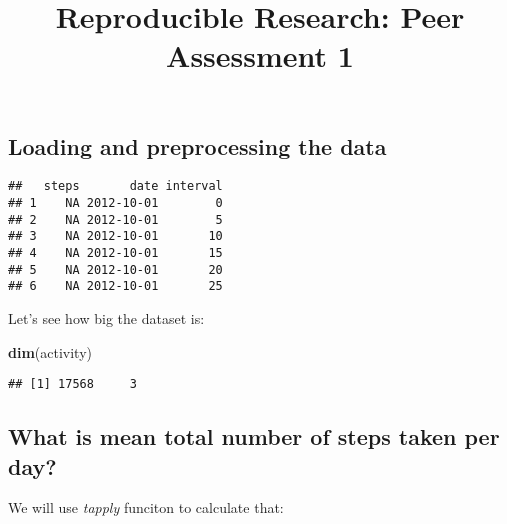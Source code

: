 \documentclass[
]{article}
\title{Reproducible Research: Peer Assessment 1}
\author{}
\date{\vspace{-2.5em}}
\newenvironment{Shaded}{\begin{snugshade}}{\end{snugshade}}
\newcommand{\AttributeTok}[1]{\textcolor[rgb]{0.13,0.29,0.53}{#1}}
\newcommand{\ConstantTok}[1]{\textcolor[rgb]{0.56,0.35,0.01}{#1}}
\newcommand{\FunctionTok}[1]{\textcolor[rgb]{0.13,0.29,0.53}{\textbf{#1}}}
\newcommand{\NormalTok}[1]{#1}
\newcommand{\OtherTok}[1]{\textcolor[rgb]{0.56,0.35,0.01}{#1}}
\newcommand{\SpecialCharTok}[1]{\textcolor[rgb]{0.81,0.36,0.00}{\textbf{#1}}}
\newcommand{\StringTok}[1]{\textcolor[rgb]{0.31,0.60,0.02}{#1}}
\begin{document}
\maketitle

\subsection{Loading and preprocessing the
data}\label{loading-and-preprocessing-the-data}

\begin{Shaded}
\end{Shaded}

\begin{verbatim}
##   steps       date interval
## 1    NA 2012-10-01        0
## 2    NA 2012-10-01        5
## 3    NA 2012-10-01       10
## 4    NA 2012-10-01       15
## 5    NA 2012-10-01       20
## 6    NA 2012-10-01       25
\end{verbatim}

Let's see how big the dataset is:

\begin{Shaded}
\begin{Highlighting}[]
\FunctionTok{dim}\NormalTok{(activity)}
\end{Highlighting}
\end{Shaded}

\begin{verbatim}
## [1] 17568     3
\end{verbatim}

\subsection{What is mean total number of steps taken per
day?}\label{what-is-mean-total-number-of-steps-taken-per-day}

We will use \emph{tapply} funciton to calculate that:

\begin{Shaded}
\end{Shaded}
\end{document}
